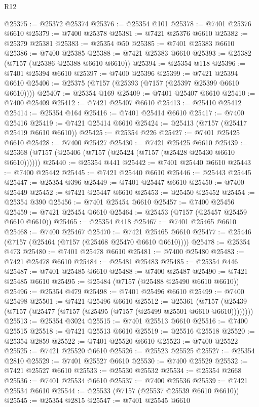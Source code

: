 \begin{lexlean}{R12}
\begin{coremodule}
@25375 := @25372 @25374
@25376 := @25354 @101
@25378 := @7401 @25376 @6610
@25379 := @7400 @25378
@25381 := @7421 @25376 @6610
@25382 := @25379 @25381
@25383 := @25354 @50
@25385 := @7401 @25383 @6610
@25386 := @7400 @25385
@25388 := @7421 @25383 @6610
@25393 := @25382 (@7157 (@25386 @25388 @6610 @6610))
@25394 := @25354 @118
@25396 := @7401 @25394 @6610
@25397 := @7400 @25396
@25399 := @7421 @25394 @6610
@25406 := @25375 (@7157 (@25393 (@7157 (@25397 @25399 @6610 @6610))))
@25407 := @25354 @169
@25409 := @7401 @25407 @6610
@25410 := @7400 @25409
@25412 := @7421 @25407 @6610
@25413 := @25410 @25412
@25414 := @25354 @164
@25416 := @7401 @25414 @6610
@25417 := @7400 @25416
@25419 := @7421 @25414 @6610
@25424 := @25413 (@7157 (@25417 @25419 @6610 @6610))
@25425 := @25354 @226
@25427 := @7401 @25425 @6610
@25428 := @7400 @25427
@25430 := @7421 @25425 @6610
@25439 := @25368 (@7157 (@25406 (@7157 (@25424 (@7157 (@25428 @25430 @6610 @6610))))))
@25440 := @25354 @441
@25442 := @7401 @25440 @6610
@25443 := @7400 @25442
@25445 := @7421 @25440 @6610
@25446 := @25443 @25445
@25447 := @25354 @396
@25449 := @7401 @25447 @6610
@25450 := @7400 @25449
@25452 := @7421 @25447 @6610
@25453 := @25450 @25452
@25454 := @25354 @390
@25456 := @7401 @25454 @6610
@25457 := @7400 @25456
@25459 := @7421 @25454 @6610
@25464 := @25453 (@7157 (@25457 @25459 @6610 @6610))
@25465 := @25354 @418
@25467 := @7401 @25465 @6610
@25468 := @7400 @25467
@25470 := @7421 @25465 @6610
@25477 := @25446 (@7157 (@25464 (@7157 (@25468 @25470 @6610 @6610))))
@25478 := @25354 @473
@25480 := @7401 @25478 @6610
@25481 := @7400 @25480
@25483 := @7421 @25478 @6610
@25484 := @25481 @25483
@25485 := @25354 @446
@25487 := @7401 @25485 @6610
@25488 := @7400 @25487
@25490 := @7421 @25485 @6610
@25495 := @25484 (@7157 (@25488 @25490 @6610 @6610))
@25496 := @25354 @479
@25498 := @7401 @25496 @6610
@25499 := @7400 @25498
@25501 := @7421 @25496 @6610
@25512 := @25361
    (@7157 (@25439 (@7157 (@25477 (@7157 (@25495 (@7157 (@25499 @25501 @6610 @6610))))))))
@25513 := @25354 @3024
@25515 := @7401 @25513 @6610
@25516 := @7400 @25515
@25518 := @7421 @25513 @6610
@25519 := @25516 @25518
@25520 := @25354 @2859
@25522 := @7401 @25520 @6610
@25523 := @7400 @25522
@25525 := @7421 @25520 @6610
@25526 := @25523 @25525
@25527 := @25354 @2810
@25529 := @7401 @25527 @6610
@25530 := @7400 @25529
@25532 := @7421 @25527 @6610
@25533 := @25530 @25532
@25534 := @25354 @2668
@25536 := @7401 @25534 @6610
@25537 := @7400 @25536
@25539 := @7421 @25534 @6610
@25544 := @25533 (@7157 (@25537 @25539 @6610 @6610))
@25545 := @25354 @2815
@25547 := @7401 @25545 @6610

\end{coremodule}
\end{lexlean}
